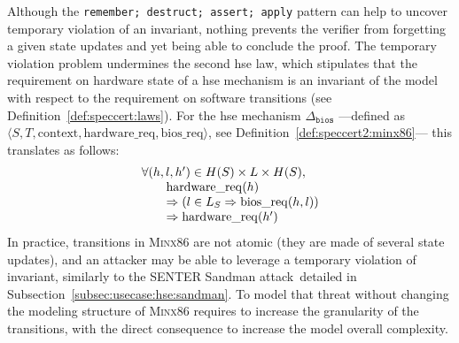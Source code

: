 \documentclass[oneside,a4paper]{memoir}
\theoremstyle{break}
\begin{document}
Although the \texttt{remember;~destruct;~assert;~apply} pattern can help to
uncover temporary violation of an invariant, nothing prevents the verifier from
forgetting a given state updates and yet being able to conclude the proof.
%
The temporary violation problem undermines the second \ac{hse} law, which
stipulates that the requirement on hardware state of a \ac{hse} mechanism is an
invariant of the model with respect to the requirement on software transitions
(see Definition~\ref{def:speccert:laws}).
%
For the \ac{hse} mechanism \( \Delta_{\mathtt{bios}} \) ---defined as
\( \langle S, T, \mathrm{context}, \mathrm{hardware\_req}, \mathrm{bios\_req}
\rangle \), see Definition~\ref{def:speccert2:minx86}--- this translates as
follows:
%
\[
  \begin{array}{l}
    \forall (h, l, h') \in H(S) \times L \times H(S), \\
    \qquad\mathrm{hardware\_req}(h) \\
    \qquad\Rightarrow (l \in L_S \Rightarrow \mathrm{bios\_req}(h, l)) \\
    \qquad\Rightarrow \mathrm{hardware\_req}(h')
  \end{array}
\]
%
In practice, transitions in {\scshape Minx86} are not atomic (they are made of
several state updates), and an attacker may be able to leverage a temporary
violation of invariant, similarly to the SENTER Sandman
attack\,\cite{kovah2015senter} detailed in
Subsection~\ref{subsec:usecase:hse:sandman}.
%
To model that threat without changing the modeling structure of {\scshape
  Minx86} requires to increase the granularity of the transitions, with the
direct consequence to increase the model overall complexity.

%

\end{document}

